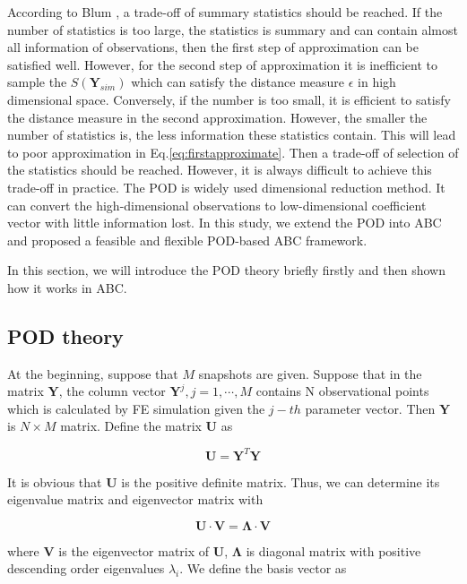 \documentclass[review]{elsarticle}
\begin{document}
According to Blum \cite{blum2013comparative}, a trade-off of summary statistics should be reached. If the number of statistics is too large, the statistics is summary and can contain almost all information of observations, then the first step of approximation can be satisfied well. However, for the second step of approximation it is inefficient to sample the $S(\mathbf{Y}_{sim})$ which can satisfy the distance measure $\epsilon$ in high dimensional space. Conversely, if the number is too small, it is efficient to satisfy the distance measure in the second approximation. However, the smaller the number of statistics is, the less information these statistics contain. This will lead to poor approximation in Eq.\ref{eq:firstapproximate}. Then a trade-off of selection of the statistics should be reached. However, it is always difficult to achieve this trade-off in practice. The POD is widely used dimensional reduction method. It can convert the high-dimensional observations to low-dimensional coefficient vector with little information lost. In this study, we extend the POD into ABC and proposed a feasible and flexible POD-based ABC framework.

In this section, we will introduce the POD theory briefly firstly and then shown how it works in ABC. 

\subsection{POD theory}

At the beginning, suppose that $M$ snapshots are given. Suppose that in the matrix $\mathbf{Y}$, the column vector $\mathbf{Y}^j, j = 1,\cdots,M$ contains N observational points which is calculated by FE simulation given the $j-th$ parameter vector. Then $\mathbf{Y}$ is $N \times M$ matrix. Define the matrix $\mathbf{U}$ as

\begin{equation}
\label{eq:covariancematrix}
\mathbf{U} = \mathbf{Y}^T\mathbf{Y}
\end{equation}

It is obvious that $\mathbf{U}$ is the positive definite matrix. Thus, we can determine its eigenvalue matrix and eigenvector matrix with

\begin{equation}
\label{eq:eigenequation}
\mathbf{U}\cdot \mathbf{V} = \mathbf{\Lambda} \cdot \mathbf{V}
\end{equation}

\noindent where $\mathbf{V}$ is the eigenvector matrix of $\mathbf{U}$, $\mathbf{\Lambda}$ is diagonal matrix with positive descending order eigenvalues $\lambda_i$. We define the basis vector as
\end{document}
